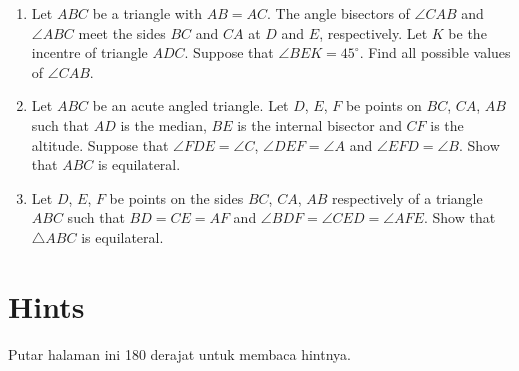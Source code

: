 \documentclass[12pt]{scrartcl}
\begin{document}
\begin{enumerate}[label=P\arabic*.,leftmargin=*,itemsep=0.6em]
\item Let $ABC$ be a triangle with $AB = AC$. The angle bisectors of $\angle CAB$ and $\angle ABC$ meet the sides $BC$ and $CA$ at $D$ and $E$, respectively. Let $K$ be the incentre of triangle $ADC$. Suppose that $\angle BEK = 45^\circ$. Find all possible values of $\angle CAB$.

\item Let $ABC$ be an acute angled triangle. Let $D$, $E$, $F$ be points on $BC$, $CA$, $AB$ such that $AD$ is the median, $BE$ is the internal bisector and $CF$ is the altitude. Suppose that $\angle FDE = \angle C$, $\angle DEF = \angle A$ and $\angle EFD = \angle B$. Show that $ABC$ is equilateral.

\item Let $D$, $E$, $F$ be points on the sides $BC$, $CA$, $AB$ respectively of a triangle $ABC$ such that $BD = CE = AF$ and $\angle BDF = \angle CED = \angle AFE$. Show that $\triangle ABC$ is equilateral.

\end{enumerate}

\newpage
\section{Hints}

Putar halaman ini 180 derajat untuk membaca hintnya.
\end{document}
